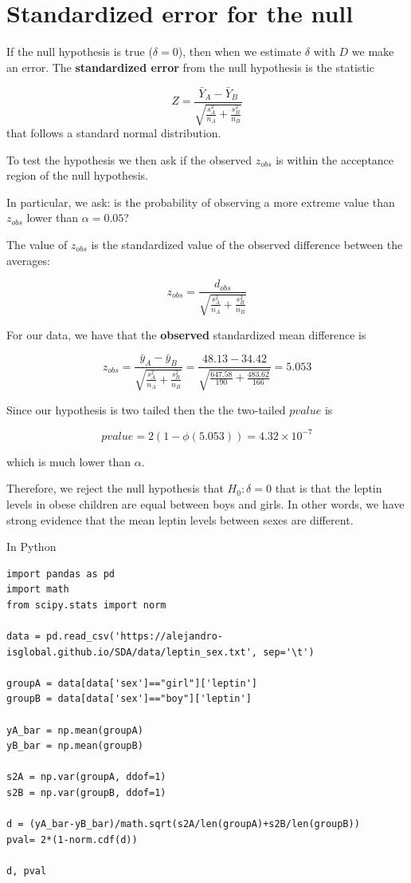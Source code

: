 \documentclass[
]{book}
\begin{document}
\hypertarget{standardized-error-for-the-null}{%
\section{Standardized error for the null}\label{standardized-error-for-the-null}}

If the null hypothesis is true (\(\delta=0\)), then when we estimate \(\delta\) with \(D\) we make an error. The \textbf{standardized error} from the null hypothesis is the statistic

\[Z=\frac{\bar{Y}_A-\bar{Y}_B}{\sqrt{\frac{s_A^2}{n_A}+\frac{s^2_B}{n_B}}}\]
that follows a standard normal distribution.

To test the hypothesis we then ask if the observed \(z_{obs}\) is within the acceptance region of the null hypothesis.

In particular, we ask: is the probability of observing a more extreme value than \(z_{obs}\) lower than \(\alpha=0.05\)?

The value of \(z_{obs}\) is the standardized value of the observed difference between the averages:

\[z_{obs}=\frac{d_{obs}}{\sqrt{\frac{s_A^2}{n_A}+\frac{s^2_B}{n_B}}}\]

For our data, we have that the \textbf{observed} standardized mean difference is

\[z_{obs}=\frac{\bar{y}_A-\bar{y}_B }{\sqrt{\frac{s^2_A}{n_A}+\frac{s^2_B}{n_B}}}=\frac{48.13-34.42}{\sqrt{\frac{647.58}{190}+\frac{483.62}{166}}}=5.053\]

Since our hypothesis is two tailed then the the two-tailed \(pvalue\) is

\[pvalue=2(1-\phi(5.053))=4.32 \times 10^{-7}\]

which is much lower than \(\alpha\).

Therefore, we reject the null hypothesis that \(H_0:\delta=0\) that is that the leptin levels in obese children are equal between boys and girls. In other words, we have strong evidence that the mean leptin levels between sexes are different.

In Python

\begin{verbatim}
import pandas as pd
import math
from scipy.stats import norm

data = pd.read_csv('https://alejandro-isglobal.github.io/SDA/data/leptin_sex.txt', sep='\t')

groupA = data[data['sex']=="girl"]['leptin']
groupB = data[data['sex']=="boy"]['leptin']

yA_bar = np.mean(groupA)
yB_bar = np.mean(groupB)

s2A = np.var(groupA, ddof=1)
s2B = np.var(groupB, ddof=1)

d = (yA_bar-yB_bar)/math.sqrt(s2A/len(groupA)+s2B/len(groupB))
pval= 2*(1-norm.cdf(d))

d, pval
\end{verbatim}
\end{document}
